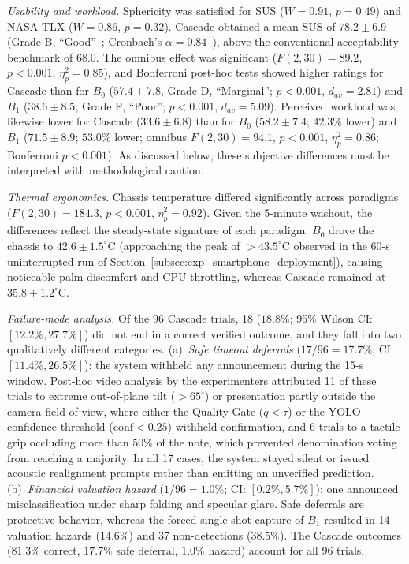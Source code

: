\documentclass[final,5p,times,twocolumn,authoryear]{elsarticle}
\begin{document}
\textit{Usability and workload.} Sphericity was satisfied for SUS ($W = 0.91$, $p = 0.49$) and NASA-TLX ($W = 0.86$, $p = 0.32$). Cascade obtained a mean SUS of \textbf{$78.2 \pm 6.9$} (Grade B, ``Good''~\cite{Bangor2008}; Cronbach's $\alpha = 0.84$~\cite{Cronbach1951}), above the conventional acceptability benchmark of $68.0$. The omnibus effect was significant ($F(2,30) = 89.2$, $p < 0.001$, $\eta_p^2 = 0.85$), and Bonferroni post-hoc tests showed higher ratings for Cascade than for $B_0$ ($57.4 \pm 7.8$, Grade D, ``Marginal''; $p < 0.001$, $d_{av} = 2.81$) and $B_1$ ($38.6 \pm 8.5$, Grade F, ``Poor''; $p < 0.001$, $d_{av} = 5.09$). Perceived workload was likewise lower for Cascade ($33.6 \pm 6.8$) than for $B_0$ ($58.2 \pm 7.4$; $42.3\%$ lower) and $B_1$ ($71.5 \pm 8.9$; $53.0\%$ lower; omnibus $F(2,30) = 94.1$, $p < 0.001$, $\eta_p^2 = 0.86$; Bonferroni $p < 0.001$). As discussed below, these subjective differences must be interpreted with methodological caution.

\textit{Thermal ergonomics.} Chassis temperature differed significantly across paradigms ($F(2,30) = 184.3$, $p < 0.001$, $\eta_p^2 = 0.92$). Given the 5-minute washout, the differences reflect the steady-state signature of each paradigm: $B_0$ drove the chassis to $42.6 \pm 1.5^\circ\text{C}$ (approaching the peak of $>43.5^\circ\text{C}$ observed in the 60-s uninterrupted run of Section~\ref{subsec:exp_smartphone_deployment}), causing noticeable palm discomfort and CPU throttling, whereas Cascade remained at $35.8 \pm 1.2^\circ\text{C}$.

\textit{Failure-mode analysis.} Of the 96 Cascade trials, 18 ($18.8\%$; 95\% Wilson CI: $[12.2\%, 27.7\%]$) did not end in a correct verified outcome, and they fall into two qualitatively different categories. (a)~\textit{Safe timeout deferrals} ($17/96 = 17.7\%$; CI: $[11.4\%, 26.5\%]$): the system withheld any announcement during the 15-s window. Post-hoc video analysis by the experimenters attributed 11 of these trials to extreme out-of-plane tilt ($>65^\circ$) or presentation partly outside the camera field of view, where either the Quality-Gate ($q < \tau$) or the YOLO confidence threshold ($\text{conf} < 0.25$) withheld confirmation, and 6 trials to a tactile grip occluding more than $50\%$ of the note, which prevented denomination voting from reaching a majority. In all 17 cases, the system stayed silent or issued acoustic realignment prompts rather than emitting an unverified prediction. (b)~\textit{Financial valuation hazard} ($1/96 = 1.0\%$; CI: $[0.2\%, 5.7\%]$): one announced misclassification under sharp folding and specular glare. Safe deferrals are protective behavior, whereas the forced single-shot capture of $B_1$ resulted in 14 valuation hazards ($14.6\%$) and 37 non-detections ($38.5\%$). The Cascade outcomes ($81.3\%$ correct, $17.7\%$ safe deferral, $1.0\%$ hazard) account for all 96 trials.
\end{document}
